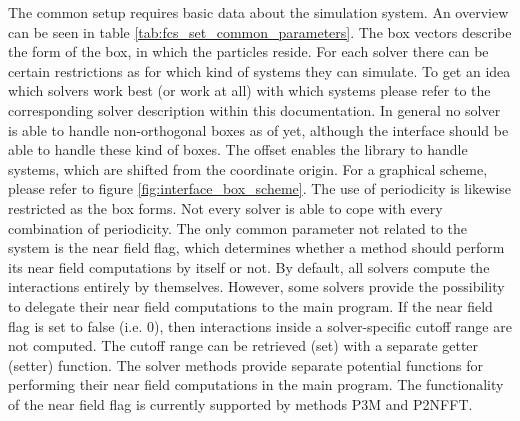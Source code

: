 The common setup requires basic data about the simulation system. An overview can be seen in table \ref{tab:fcs_set_common_parameters}. The box vectors
describe the form of the box, in which the particles reside. For each solver there can be certain restrictions as for which kind of systems they can simulate. 
To get an idea which solvers work best (or work at all) with which systems please refer to the corresponding solver description within this documentation.
In general no solver is able to handle non-orthogonal boxes as of yet, although the interface should be able to handle these kind of boxes. The offset
enables the library to handle systems, which are shifted from the coordinate origin. For a graphical scheme, please refer to figure \ref{fig:interface_box_scheme}.
The use of periodicity is likewise restricted as the box forms. Not every solver is able to cope with every combination of periodicity. The only
common parameter not related to the system is the near field flag, which determines whether a method should perform its near field computations by itself or not.
By default, all solvers compute the interactions entirely by themselves. However, some solvers provide the possibility to delegate their near field 
computations to the main program. If the near field flag is set to false (i.e. 0), then interactions inside a solver-specific cutoff range are not computed.
The cutoff range can be retrieved (set) with a separate getter (setter) function. The solver methods provide separate potential functions for performing their
near field computations in the main program. The functionality of the near field flag is currently supported by methods P3M and P2NFFT.

